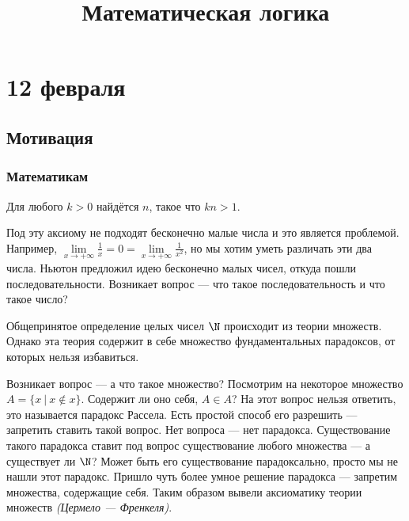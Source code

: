 



\title{Математическая логика}
\maketitle

\tableofcontents

\chapter{12 февраля}

\setcounter{section}{-1}

\section{Мотивация}

\subsection{Математикам}

\begin{axiom}[Архимеда]
    Для любого \(k > 0\) найдётся \(n\), такое что \(kn > 1\).
\end{axiom}

Под эту аксиому не подходят бесконечно малые числа и это является проблемой. Например, \(\lim\limits_{x \to +\infty} \frac{1}{x} = 0 = \lim\limits_{x \to +\infty} \frac{1}{x^2}\), но мы хотим уметь различать эти два числа. Ньютон предложил идею бесконечно малых чисел, откуда пошли последовательности. Возникает вопрос --- что такое последовательность и что такое число?

Общепринятое определение целых чисел \(\N\) происходит из теории множеств. Однако эта теория содержит в себе множество фундаментальных парадоксов, от которых нельзя избавиться.

Возникает вопрос --- а что такое множество? Посмотрим на некоторое множество \(A = \{x\ |\ x\not\in x\}\). Содержит ли оно себя, \(A\in A\)? На этот вопрос нельзя ответить, это называется парадокс Рассела. Есть простой способ его разрешить --- запретить ставить такой вопрос. Нет вопроса --- нет парадокса. Существование такого парадокса ставит под вопрос существование любого множества --- а существует ли \(\N\)? Может быть его существование парадоксально, просто мы не нашли этот парадокс. Пришло чуть более умное решение парадокса --- запретим множества, содержащие себя. Таким образом вывели аксиоматику теории множеств \textit{(Цермело --- Френкеля)}.

